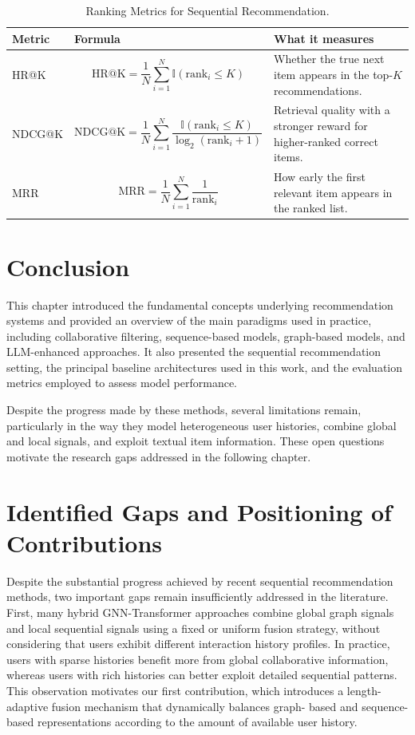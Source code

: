 \documentclass[12pt,a4paper]{report}
\begin{document}
\begin{table}[h]
\centering
\begin{tabular}{p{2.5cm} p{5.2cm} p{5.5cm}}
\toprule
\textbf{Metric} & \textbf{Formula} & \textbf{What it measures} \\
\midrule
HR@K &
\[
\mathrm{HR@K} = \frac{1}{N}\sum_{i=1}^{N}\mathbb{I}(\text{rank}_i \leq K)
\]
&
Whether the true next item appears in the top-\(K\) recommendations. \\
\midrule
NDCG@K &
\[
\mathrm{NDCG@K} = \frac{1}{N}\sum_{i=1}^{N}\frac{\mathbb{I}(\text{rank}_i \leq K)}{\log_2(\text{rank}_i + 1)}
\]
&
Retrieval quality with a stronger reward for higher-ranked correct items. \\
\midrule
MRR &
\[
\mathrm{MRR} = \frac{1}{N}\sum_{i=1}^{N}\frac{1}{\text{rank}_i}
\]
&
How early the first relevant item appears in the ranked list. \\
\bottomrule
\end{tabular}
\caption{Ranking Metrics for Sequential Recommendation.}
\label{tab:evaluation_metrics}
\end{table}

\section{Conclusion}

This chapter introduced the fundamental concepts underlying recommendation
systems and provided an overview of the main paradigms used in practice,
including collaborative filtering, sequence-based models, graph-based models,
and LLM-enhanced approaches. It also presented the sequential recommendation
setting, the principal baseline architectures used in this work, and the
evaluation metrics employed to assess model performance.

Despite the progress made by these methods, several limitations remain,
particularly in the way they model heterogeneous user histories, combine
global and local signals, and exploit textual item information. These open
questions motivate the research gaps addressed in the following chapter.


\section{Identified Gaps and Positioning of Contributions}

Despite the substantial progress achieved by recent sequential recommendation
methods, two important gaps remain insufficiently addressed in the literature.
First, many hybrid GNN-Transformer approaches combine global graph signals and
local sequential signals using a fixed or uniform fusion strategy, without
considering that users exhibit different interaction history profiles. In
practice, users with sparse histories benefit more from global collaborative
information, whereas users with rich histories can better exploit detailed
sequential patterns. This observation motivates our first contribution, which
introduces a length-adaptive fusion mechanism that dynamically balances graph-
based and sequence-based representations according to the amount of available
user history.
\end{document}
